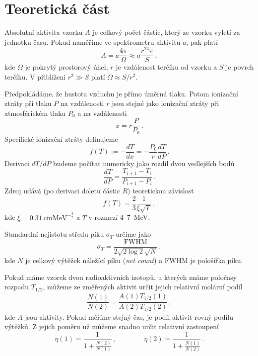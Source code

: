 \section*{Teoretická část}
Absolutní aktivita vzorku $A$ je celkový počet částic, který ze vzorku vyletí za jednotku času.
Pokud naměříme ve spektrometru aktivitu $a$, pak platí
\begin{equation}\label{aktivita}
A=a \frac{4\pi}{\Omega} \approx a \frac{r^24\pi}{S} \,,
\end{equation}
kde $\Omega$ je pokrytý prostorový úhel, $r$ je vzdálenost terčíku od vzorku a $S$ je povrch terčíku. V přiblížení $r^2 \gg S$ platí $\Omega \approx S/r^2$.


Předpokládáme, že hustota vzduchu je přímo úměrná tlaku. Potom ionizační ztráty při tlaku $P$ na vzdálenosti $r$ jsou stejné jako ionizační ztráty při atmosférickém tlaku $P_0$ a na vzdálenosti
\begin{equation}
x=r\frac{P}{P_0} \,.
\end{equation}
Specifické ionizační ztráty definujeme \cite{skripta}
\begin{equation} \label{f}
f(T):=-\frac{dT}{dx}=-\frac{P_0}{r}\frac{dT}{dP} \,.
\end{equation}
Derivaci $dT/dP$ budeme počítat numericky jako rozdíl dvou vedlejších bodů
\begin{equation} \label{dTdP}
\frac{dT}{dP}=\frac{T_{i+1}-T_i}{P_{i+1}-P_{i}} \,.
\end{equation}
Zdroj \cite{skripta} udává (po derivaci doletu částic $R$) teoretickou závislost
\begin{equation} \label{teoreticka}
f(T)=\frac{2}{3} \frac{1}{\xi \sqrt{T}} \,,
\end{equation}
kde $\xi=\SI{0.31}{\cm\MeV}^{-\frac{3}{2}}$ a $T$ v rozmezí \num{4}--\SI{7}{\MeV}.


Standardní nejistotu středu píku $\sigma_T$ určíme jako
\begin{equation}\label{chyba}
\sigma_T=\frac{\text{FWHM}}{2\sqrt{2\log 2}\sqrt{N}} \,,
\end{equation}
kde $N$ je celkový výtěžek náležící píku (\emph{net count}) a FWHM je pološířka píku.


Pokud máme vzorek dvou radioaktivních izotopů, u kterých známe poločasy rozpadu $T_{1/2}$, můžeme ze změřených aktivit určit jejich relativní molární podíl
\begin{equation} \label{Pu}
\frac{N(1)}{N(2)}=\frac{A(1) T_{1/2}(1)}{A(2) T_{1/2}(2)} \,,
\end{equation}
kde $A$ jsou aktivity. Pokud měříme stejný čas, je podíl aktivit rovný podílu výtěžků. Z jejich poměru už můžeme snadno určit relativní zastoupení
\begin{equation} 
\eta(1)=\frac{1}{1+\frac{N(2)}{N(1)}} \,, \qquad \qquad \eta(2)=\frac{1}{1+\frac{N(1)}{N(2)}} \,.
\end{equation}